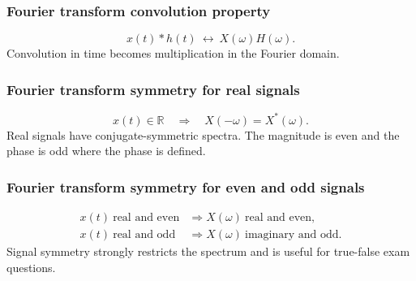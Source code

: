 \subsubsection{Fourier transform convolution property}
\[
x(t)*h(t)\ \longleftrightarrow\ X(\omega)H(\omega).
\]
Convolution in time becomes multiplication in the Fourier domain.

\subsubsection{Fourier transform symmetry for real signals}
\[
x(t)\in\mathbb{R}\quad \Rightarrow\quad X(-\omega)=X^*(\omega).
\]
Real signals have conjugate-symmetric spectra. The magnitude is even and the phase is odd where the phase is defined.

\subsubsection{Fourier transform symmetry for even and odd signals}
\[
\begin{aligned}
x(t)\ \text{real and even} &\Rightarrow X(\omega)\ \text{real and even},\\
x(t)\ \text{real and odd} &\Rightarrow X(\omega)\ \text{imaginary and odd}.
\end{aligned}
\]
Signal symmetry strongly restricts the spectrum and is useful for true-false exam questions.
